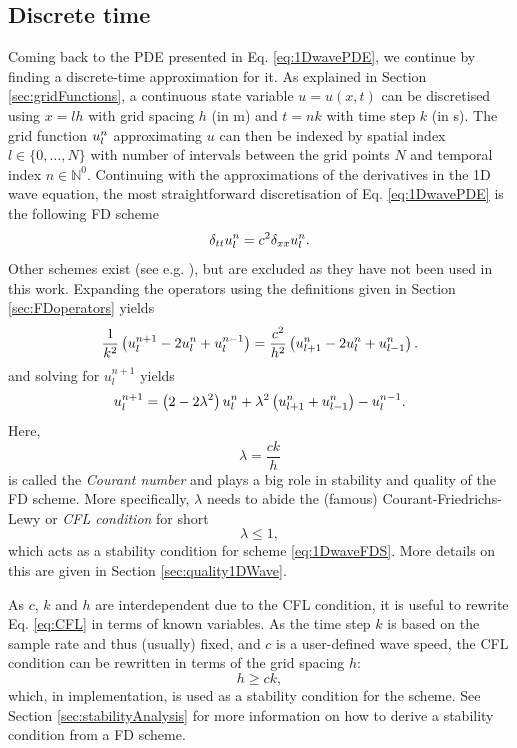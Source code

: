 \subsection{Discrete time}\label{sec:1DWaveDisc}
Coming back to the PDE presented in Eq. \eqref{eq:1DwavePDE}, we continue by finding a discrete-time approximation for it. As explained in Section \ref{sec:gridFunctions}, a continuous state variable $u = u(x,t)$ can be discretised using $x=lh$ with grid spacing $h$ (in m) and $t=nk$ with time step $k$ (in s). The grid function $u_l^n$ approximating $u$ can then be indexed by spatial index $l \in \{0, \hdots, N\}$ with number of intervals between the grid points $N$ and temporal index $n\in \mathbb{N}^0$. Continuing with the approximations of the derivatives in the 1D wave equation, the most straightforward  discretisation of Eq. \eqref{eq:1DwavePDE} is the following FD scheme
\begin{equation}\label{eq:1DwaveFDS}
    \delta_{tt} u_l^n = c^2 \delta_{xx} u_l^n.
\end{equation}
Other schemes exist (see e.g. \cite{theBible}), but are excluded as they have not been used in this work. Expanding the operators using the definitions given in Section \ref{sec:FDoperators} yields
\begin{equation}
    \frac{1}{k^2}\left(u_l^{n+1}-2 u_l^n + u_l^{n-1}\right) = \frac{c^2}{h^2} \left(u_{l+1}^n - 2 u_l^n + u_{l-1}^n\right).
\end{equation}
and solving for $u_l^{n+1}$ yields
\begin{equation}\label{eq:1DwaveUpdate}
    u_l^{n+1} = \left(2-2\lambda^2\right) u_l^n  + \lambda^2\left(u_{l+1}^n + u_{l-1}^n\right) - u_l^{n-1}.
\end{equation}
Here, 
\begin{equation}\label{eq:courantNumber}
    \lambda = \frac{ck}{h}
\end{equation}
is called the \textit{Courant number} and plays a big role in stability and quality of the FD scheme. More specifically, $\lambda$ needs to abide the (famous) Courant-Friedrichs-Lewy or \textit{CFL condition} for short \cite{Courant1928}
\begin{equation}\label{eq:CFL}
    \lambda \leq 1,
\end{equation}
which acts as a stability condition for scheme \eqref{eq:1DwaveFDS}. More details on this are given in Section \ref{sec:quality1DWave}.

As $c$, $k$ and $h$ are interdependent due to the CFL condition, it is useful to rewrite Eq. \eqref{eq:CFL} in terms of known variables.
As the time step $k$ is based on the sample rate and thus (usually) fixed, and $c$ is a user-defined wave speed, the CFL condition can be rewritten in terms of the grid spacing $h$:
\begin{equation}\label{eq:1DWaveStabilityCond}
    h \geq ck,
\end{equation}
%
which, in implementation, is used as a stability condition for the scheme. See Section \ref{sec:stabilityAnalysis} for more information on how to derive a stability condition from a FD scheme.

